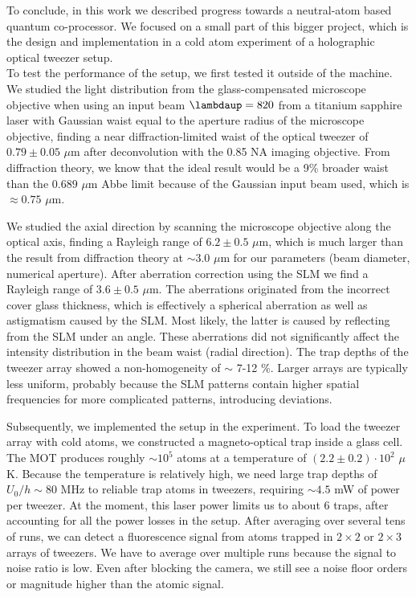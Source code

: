 To conclude, in this work we described progress towards a neutral-atom based quantum co-processor. 
We focused on a small part of this bigger project, which is the design and implementation in a cold atom experiment of a holographic optical tweezer setup. \\

\noindent To test the performance of the setup, we first tested it outside of the machine.
We studied the light distribution from the glass-compensated microscope objective when using an input beam $\lambdaup = 820$ from a titanium sapphire laser with Gaussian waist equal to the aperture radius of the microscope objective, finding a near diffraction-limited waist of the optical tweezer of $0.79 \pm 0.05$ $\mu$m after deconvolution with the 0.85 NA imaging objective. 
From diffraction theory, we know that the ideal result would be a 9\% broader waist than the $0.689$ $\mu$m Abbe limit because of the Gaussian input beam used, which is $\approx 0.75$ $\mu$m.

We studied the axial direction by scanning the microscope objective along the optical axis, finding a Rayleigh range of $6.2\pm0.5$ $\mu$m, which is much larger than the result from diffraction theory at $\sim 3.0$ $\mu$m for our parameters (beam diameter, numerical aperture). 
After aberration correction using the SLM we find a Rayleigh range of $3.6 \pm 0.5$ $\mu$m.
The aberrations originated from the incorrect cover glass thickness, which is effectively a spherical aberration as well as astigmatism caused by the SLM.
Most likely, the latter is caused by reflecting from the SLM under an angle.
These aberrations did not significantly affect the intensity distribution in the beam waist (radial direction).
The trap depths of the tweezer array showed a non-homogeneity of $\sim$ 7-12 \%.
Larger arrays are typically less uniform, probably because the SLM patterns contain higher spatial frequencies for more complicated patterns, introducing deviations. 

Subsequently, we implemented the setup in the experiment.
To load the tweezer array with cold atoms, we constructed a magneto-optical trap inside a glass cell. 
The MOT produces roughly $\sim10^5$ atoms at a temperature of $(2.2 \pm 0.2) \cdot 10^2$ $\mu$K.
Because the temperature is relatively high, we need large trap depths of $U_0/h \sim 80$ MHz to reliable trap atoms in tweezers, requiring $\sim 4.5$ mW of power per tweezer.
At the moment, this laser power limits us to about 6 traps, after accounting for all the power losses in the setup. 
After averaging over several tens of runs, we can detect a fluorescence signal from atoms trapped in $2\times 2$ or $2\times 3$ arrays of tweezers. 
We have to average over multiple runs because the signal to noise ratio is low.
Even after blocking the camera, we still see a noise floor orders or magnitude higher than the atomic signal. \\

